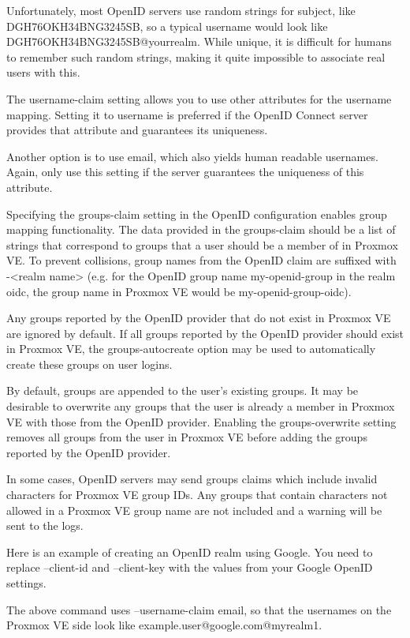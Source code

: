 Unfortunately, most OpenID servers use random strings for subject, like DGH76OKH34BNG3245SB, so a typical username would look like DGH76OKH34BNG3245SB@yourrealm. While unique, it is difficult for humans to remember such random strings, making it quite impossible to associate real users with this.

The username-claim setting allows you to use other attributes for the username mapping. Setting it to username is preferred if the OpenID Connect server provides that attribute and guarantees its uniqueness.

Another option is to use email, which also yields human readable usernames. Again, only use this setting if the server guarantees the uniqueness of this attribute.

Specifying the groups-claim setting in the OpenID configuration enables group mapping functionality. The data provided in the groups-claim should be a list of strings that correspond to groups that a user should be a member of in Proxmox VE. To prevent collisions, group names from the OpenID claim are suffixed with -<realm name> (e.g. for the OpenID group name my-openid-group in the realm oidc, the group name in Proxmox VE would be my-openid-group-oidc).

Any groups reported by the OpenID provider that do not exist in Proxmox VE are ignored by default. If all groups reported by the OpenID provider should exist in Proxmox VE, the groups-autocreate option may be used to automatically create these groups on user logins.

By default, groups are appended to the user’s existing groups. It may be desirable to overwrite any groups that the user is already a member in Proxmox VE with those from the OpenID provider. Enabling the groups-overwrite setting removes all groups from the user in Proxmox VE before adding the groups reported by the OpenID provider.

In some cases, OpenID servers may send groups claims which include invalid characters for Proxmox VE group IDs. Any groups that contain characters not allowed in a Proxmox VE group name are not included and a warning will be sent to the logs.

Here is an example of creating an OpenID realm using Google. You need to replace --client-id and --client-key with the values from your Google OpenID settings.

The above command uses --username-claim email, so that the usernames on the Proxmox VE side look like example.user@google.com@myrealm1.

